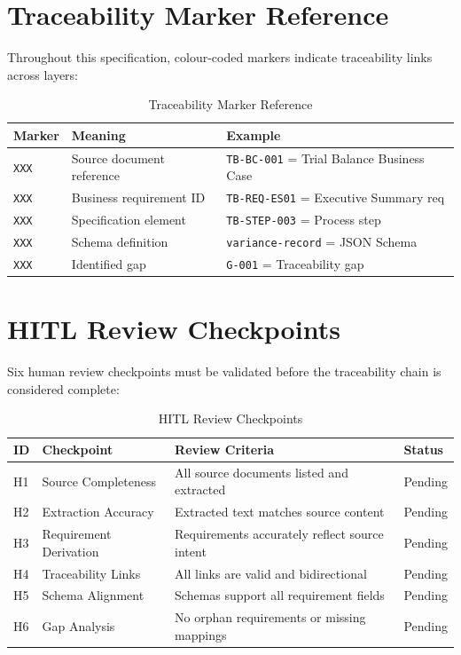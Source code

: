 \documentclass[11pt,a4paper,twoside]{report}
\newcommand{\srcref}[1]{\texttt{#1}}
\newcommand{\reqref}[1]{\texttt{#1}}
\newcommand{\specref}[1]{\texttt{#1}}
\newcommand{\schemaref}[1]{\texttt{#1}}
\newcommand{\gapref}[1]{\texttt{#1}}
\begin{document}
\section{Traceability Marker Reference}
\label{sec:marker-reference}

Throughout this specification, colour-coded markers indicate
traceability links across layers:

\begin{table}[h]
\centering
\caption{Traceability Marker Reference}
\label{tab:marker-reference}
\begin{tabularx}{\textwidth}{@{}C{3cm}L{5cm}L{6cm}@{}}
\toprule
\textbf{Marker} & \textbf{Meaning} & \textbf{Example} \\
\midrule
\srcref{XXX} & Source document reference & \srcref{TB-BC-001} = Trial Balance Business Case \\
\reqref{XXX} & Business requirement ID & \reqref{TB-REQ-ES01} = Executive Summary req \\
\specref{XXX} & Specification element & \specref{TB-STEP-003} = Process step \\
\schemaref{XXX} & Schema definition & \schemaref{variance-record} = JSON Schema \\
\gapref{XXX} & Identified gap & \gapref{G-001} = Traceability gap \\
\bottomrule
\end{tabularx}
\end{table}

\section{HITL Review Checkpoints}
\label{sec:review-checkpoints}

Six human review checkpoints must be validated before the traceability
chain is considered complete:

\begin{table}[h]
\centering
\caption{HITL Review Checkpoints}
\label{tab:review-checkpoints}
\begin{tabularx}{\textwidth}{@{}C{1cm}L{4cm}L{7cm}C{2cm}@{}}
\toprule
\textbf{ID} & \textbf{Checkpoint} & \textbf{Review Criteria} & \textbf{Status} \\
\midrule
H1 & Source Completeness & All source documents listed and extracted & Pending \\
H2 & Extraction Accuracy & Extracted text matches source content & Pending \\
H3 & Requirement Derivation & Requirements accurately reflect source intent & Pending \\
H4 & Traceability Links & All links are valid and bidirectional & Pending \\
H5 & Schema Alignment & Schemas support all requirement fields & Pending \\
H6 & Gap Analysis & No orphan requirements or missing mappings & Pending \\
\bottomrule
\end{tabularx}
\end{table}
\end{document}
